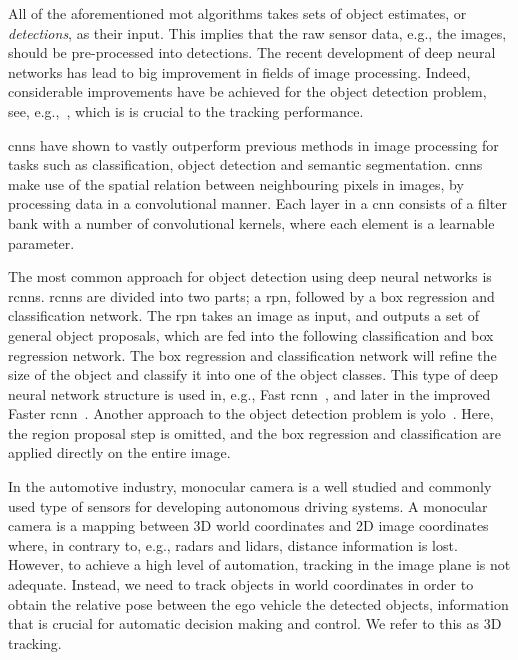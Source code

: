 \documentclass[conference]{IEEEtran}
\begin{document}
All of the aforementioned \gls{mot} algorithms takes sets of object estimates, or \textit{detections}, as their input. This implies that the raw sensor data, e.g., the images, should be pre-processed into detections.
The recent development of deep neural networks has lead to big improvement in fields of image processing.
Indeed, considerable improvements have be achieved for the object detection problem, see, e.g.,~\cite{Ren2015,Redmon2016}, which is is crucial to the tracking performance.



\Glspl{cnn} \cite{LeCun1998} have shown to vastly outperform previous methods in image processing for tasks such as classification, object detection and semantic segmentation.
\Glspl{cnn} make use of the spatial relation between neighbouring pixels in images, by processing data in a convolutional manner. Each layer in a \gls{cnn} consists of a filter bank with a number of convolutional kernels, where each element is a learnable parameter.

The most common approach for object detection using deep neural networks is \glspl{rcnn}. \Glspl{rcnn} are divided into two parts; a \gls{rpn}, followed by a box regression and classification network. The \gls{rpn} takes an image as input, and outputs a set of general object proposals, which are fed into the following classification and box regression network. The box regression and classification network will refine the size of the object and classify it into one of the object classes. This type of deep neural network structure is used in, e.g., Fast \gls{rcnn}~\cite{Girshick2015}, and later in the improved Faster \gls{rcnn}~\cite{Ren2015}. Another approach to the object detection problem is \gls{yolo}~\cite{Redmon2016}. Here, the region proposal step is omitted, and the box regression and classification are applied directly on the entire image.

In the automotive industry, monocular camera is a well studied and commonly used type of sensors for developing autonomous driving systems.
A monocular camera is a mapping between 3D world coordinates and 2D image coordinates~\cite{RichardHartley2004} where, in contrary to, e.g., radars and lidars, distance information is lost.
However, to achieve a high level of automation, tracking in the image plane is not adequate.
Instead, we need to track objects in world coordinates in order to obtain the relative pose between the ego vehicle the detected objects, information that is crucial for automatic decision making and control.
We refer to this as 3D tracking.
\end{document}
